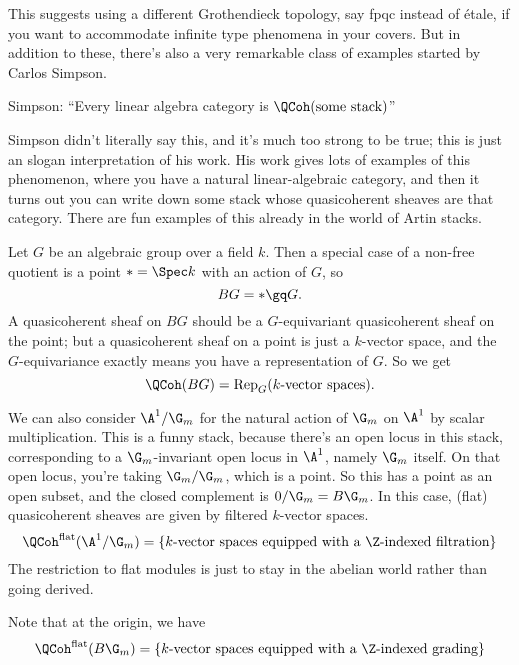 This suggests using a different Grothendieck topology, say fpqc instead of \'etale, if you want to accommodate infinite type phenomena in your covers. But in addition to these, there's also a very remarkable class of examples started by Carlos Simpson.

\begin{center}
  Simpson: ``Every linear algebra category is $\QCoh(\text{some stack})$''
\end{center}

Simpson didn't literally say this, and it's much too strong to be true; this is just an slogan interpretation of his work. His work gives lots of examples of this phenomenon, where you have a natural linear-algebraic category, and then it turns out you can write down some stack whose quasicoherent sheaves are that category. There are fun examples of this already in the world of Artin stacks.

\begin{example}[\yt{28m22s}{Representations}]
  Let $G$ be an algebraic group over a field $k$. Then a special case of a non-free quotient is a point $*=\Spec k$ with an action of $G$, so
  \[ BG = * \gq G. \]
  A quasicoherent sheaf on $BG$ should be a $G$-equivariant quasicoherent sheaf on the point; but a quasicoherent sheaf on a point is just a $k$-vector space, and the $G$-equivariance exactly means you have a representation of $G$. So we get
  \[ \QCoh(BG) = \operatorname{Rep}_G(\text{$k$-vector spaces}). \]
\end{example}

\begin{example}
  We can also consider $\A^1/\G_m$ for the natural action of $\G_m$ on $\A^1$ by scalar multiplication. This is a funny stack, because there's an open locus in this stack, corresponding to a $\G_m$-invariant open locus in $\A^1$, namely $\G_m$ itself. On that open locus, you're taking $\G_m/\G_m$, which is a point. So this has a point as an open subset, and the closed complement is $0/\G_m=B\G_m$. In this case, (flat) quasicoherent sheaves are given by filtered $k$-vector spaces.
  \[
    \QCoh^{\text{flat}}(\A^1/\G_m) = \{\text{$k$-vector spaces equipped with a $\Z$-indexed filtration}\}
  \]
  The restriction to flat modules is just to stay in the abelian world rather than going derived.

  Note that at the origin, we have
  \[
    \QCoh^{\text{flat}}(B\G_m) = \{\text{$k$-vector spaces equipped with a $\Z$-indexed grading}\}
  \]
\end{example}

